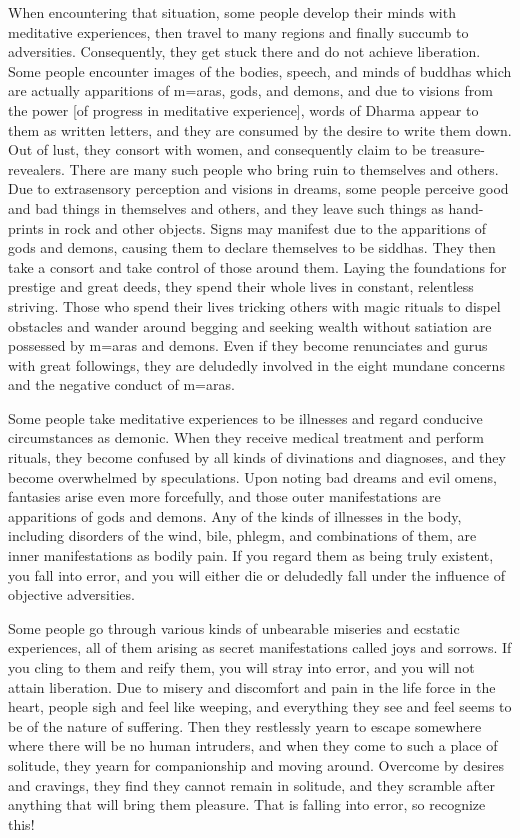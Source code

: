 \documentclass[11pt,twocolumn]{article}
\begin{document}
When encountering that situation, some people develop their minds with
meditative experiences, then travel to many regions and finally
succumb to adversities. Consequently, they get stuck there and do not
achieve liberation. Some people encounter images of the bodies,
speech, and minds of buddhas which are actually apparitions of
m\a={a}ras, gods, and demons, and due to visions from the power [of
  progress in meditative experience], words of Dharma appear to them
as written letters, and they are consumed by the desire to write them
down. Out of lust, they consort with women, and consequently claim to
be treasure\hyp{}revealers. There are many such people who bring ruin
to themselves and others. Due to extrasensory perception and visions
in dreams, some people perceive good and bad things in themselves and
others, and they leave such things as hand\hyp{}prints in rock and
other objects. Signs may manifest due to the apparitions of gods and
demons, causing them to declare themselves to be siddhas. They then
take a consort and take control of those around them. Laying the
foundations for prestige and great deeds, they spend their whole lives
in constant, relentless striving. Those who spend their lives tricking
others with magic rituals to dispel obstacles and wander around
begging and seeking wealth without satiation are possessed by
m\a={a}ras and demons. Even if they become renunciates and gurus with
great followings, they are deludedly involved in the eight mundane
concerns and the negative conduct of m\a={a}ras.

Some people take meditative experiences to be illnesses and regard
conducive circumstances as demonic. When they receive medical
treatment and perform rituals, they become confused by all kinds of
divinations and diagnoses, and they become overwhelmed by
speculations. Upon noting bad dreams and evil omens, fantasies arise
even more forcefully, and those outer manifestations are apparitions
of gods and demons. Any of the  kinds of illnesses
in the body, including disorders of the wind, bile, phlegm, and
combinations of them, are inner manifestations as bodily pain. If you
regard them as being truly existent, you fall into error, and you will
either die or deludedly fall under the influence of objective
adversities.

Some people go through various kinds of unbearable miseries and
ecstatic experiences, all of them arising as secret manifestations
called joys and sorrows. If you cling to them and reify them, you will
stray into error, and you will not attain liberation. Due to misery
and discomfort and pain in the life force in the heart, people sigh
and feel like weeping, and everything they see and feel seems to be of
the nature of suffering. Then they restlessly yearn to escape
somewhere where there will be no human intruders, and when they come
to such a place of solitude, they yearn for companionship and moving
around. Overcome by desires and cravings, they find they cannot remain
in solitude, and they scramble after anything that will bring them
pleasure. That is falling into error, so recognize this!
\end{document}
